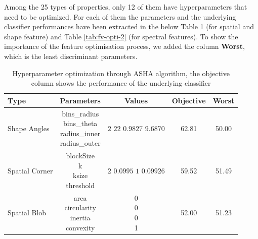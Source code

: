 \documentclass[../thesis.tex]{subfiles}
\begin{document}
    Among the 25 types of properties, only 12 of them have hyperparameters that need to be optimized. For each of them the parameters and the underlying classifier performances have been extracted in the below Table \ref{tab:fv-opti-1} (for spatial and shape feature) and Table \ref{tab:fv-opti-2} (for spectral features). To show the importance of the feature optimisation process, we added the column \textbf{Worst}, which is the least discriminant parameters. 
    
    
    \begin{table}[H]
        \centering
        \begin{tabular}{l c c c c}
            \hline
            \textbf{Type} & \textbf{Parameters} & \textbf{Values} & \textbf{Objective} & \textbf{Worst} \\
            \hline
            Shape Angles &
            \makecell{bins\_radius\\ bins\_theta \\ radius\_inner \\ radius\_outer} &
            \makecell{$2$\\$22$\\$0.9827$\\$9.6870$} &
            62.81 &
            50.00 \\
            \hline
            Spatial Corner &
            \makecell{blockSize \\ k \\ ksize \\ threshold} &
            \makecell{$2$ \\$0.0995$\\$1$ \\$0.09926$} &
            59.52 &
            51.49 \\
            \hline
            Spatial Blob &
            \makecell{area\\circularity\\inertia\\convexity} &
            \makecell{0 \\0\\0 \\1} &
            52.00 &
            51.23 \\
            \hline
        \end{tabular}
        \caption{Hyperparameter optimization through ASHA algorithm, the objective column shows the performance of the underlying classifier}
        \label{tab:fv-opti-1}
    \end{table}
    
\end{document}
